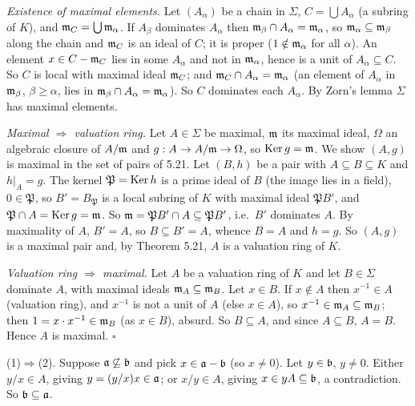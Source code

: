\documentclass[11pt]{article}
\begin{document}
\emph{Existence of maximal elements.} Let $(A_\alpha)$ be a chain in $\Sigma$, $C=\bigcup A_\alpha$ (a subring of $K$), and $\mathfrak m_C=\bigcup\mathfrak m_\alpha$. If $A_\beta$ dominates $A_\alpha$ then $\mathfrak m_\beta\cap A_\alpha=\mathfrak m_\alpha$, so $\mathfrak m_\alpha\subseteq\mathfrak m_\beta$ along the chain and $\mathfrak m_C$ is an ideal of $C$; it is proper ($1\notin\mathfrak m_\alpha$ for all $\alpha$). An element $x\in C-\mathfrak m_C$ lies in some $A_\alpha$ and not in $\mathfrak m_\alpha$, hence is a unit of $A_\alpha\subseteq C$. So $C$ is local with maximal ideal $\mathfrak m_C$; and $\mathfrak m_C\cap A_\alpha=\mathfrak m_\alpha$ (an element of $A_\alpha$ in $\mathfrak m_\beta$, $\beta\ge\alpha$, lies in $\mathfrak m_\beta\cap A_\alpha=\mathfrak m_\alpha$). So $C$ dominates each $A_\alpha$. By Zorn's lemma $\Sigma$ has maximal elements.

\emph{Maximal $\Rightarrow$ valuation ring.} Let $A\in\Sigma$ be maximal, $\mathfrak m$ its maximal ideal, $\Omega$ an algebraic closure of $A/\mathfrak m$ and $g:A\to A/\mathfrak m\to\Omega$, so $\operatorname{Ker} g=\mathfrak m$. We show $(A,g)$ is maximal in the set of pairs of 5.21. Let $(B,h)$ be a pair with $A\subseteq B\subseteq K$ and $h|_A=g$. The kernel $\mathfrak P=\operatorname{Ker} h$ is a prime ideal of $B$ (the image lies in a field), $0\in\mathfrak P$, so $B'=B_\mathfrak P$ is a local subring of $K$ with maximal ideal $\mathfrak P B'$, and $\mathfrak P\cap A=\operatorname{Ker} g=\mathfrak m$. So $\mathfrak m=\mathfrak P B'\cap A\subseteq\mathfrak P B'$, i.e.\ $B'$ dominates $A$. By maximality of $A$, $B'=A$, so $B\subseteq B'=A$, whence $B=A$ and $h=g$. So $(A,g)$ is a maximal pair and, by Theorem 5.21, $A$ is a valuation ring of $K$.

\emph{Valuation ring $\Rightarrow$ maximal.} Let $A$ be a valuation ring of $K$ and let $B\in\Sigma$ dominate $A$, with maximal ideals $\mathfrak m_A\subseteq\mathfrak m_B$. Let $x\in B$. If $x\notin A$ then $x^{-1}\in A$ (valuation ring), and $x^{-1}$ is not a unit of $A$ (else $x\in A$), so $x^{-1}\in\mathfrak m_A\subseteq\mathfrak m_B$; then $1=x\cdot x^{-1}\in\mathfrak m_B$ (as $x\in B$), absurd. So $B\subseteq A$, and since $A\subseteq B$, $A=B$. Hence $A$ is maximal. \hfill$\square$

\pf
(1)$\Rightarrow$(2). Suppose $\mathfrak a\not\subseteq\mathfrak b$ and pick $x\in\mathfrak a-\mathfrak b$ (so $x\ne0$). Let $y\in\mathfrak b$, $y\ne0$. Either $y/x\in A$, giving $y=(y/x)x\in\mathfrak a$; or $x/y\in A$, giving $x\in yA\subseteq\mathfrak b$, a contradiction. So $\mathfrak b\subseteq\mathfrak a$.
\end{document}
